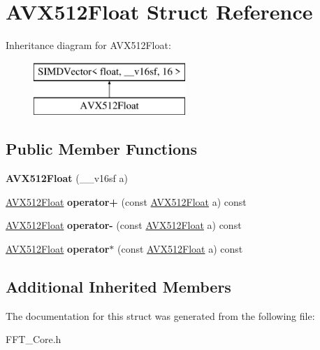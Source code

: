 \hypertarget{struct_a_v_x512_float}{}\section{A\+V\+X512\+Float Struct Reference}
\label{struct_a_v_x512_float}
Inheritance diagram for A\+V\+X512\+Float\+:\begin{figure}[H]
\begin{center}
\leavevmode
\includegraphics[height=2.000000cm]{struct_a_v_x512_float}
\end{center}
\end{figure}
\subsection*{Public Member Functions}
\begin{DoxyCompactItemize}
\item 
\mbox{\label{struct_a_v_x512_float_a0ce2d50f80701d366dfaf02eee399b0b}} 
{\bfseries A\+V\+X512\+Float} (\+\_\+\+\_\+v16sf a)
\item 
\mbox{\label{struct_a_v_x512_float_ad25812839113c94a645a2a60cae62a9b}} 
\hyperlink{struct_a_v_x512_float}{A\+V\+X512\+Float} {\bfseries operator+} (const \hyperlink{struct_a_v_x512_float}{A\+V\+X512\+Float} a) const
\item 
\mbox{\label{struct_a_v_x512_float_a3567e7c1b9cf050882cf7bb7bb103a36}} 
\hyperlink{struct_a_v_x512_float}{A\+V\+X512\+Float} {\bfseries operator-\/} (const \hyperlink{struct_a_v_x512_float}{A\+V\+X512\+Float} a) const
\item 
\mbox{\label{struct_a_v_x512_float_a8fd207ff1b6666fbaa6b3226e265308f}} 
\hyperlink{struct_a_v_x512_float}{A\+V\+X512\+Float} {\bfseries operator$\ast$} (const \hyperlink{struct_a_v_x512_float}{A\+V\+X512\+Float} a) const
\end{DoxyCompactItemize}
\subsection*{Additional Inherited Members}


The documentation for this struct was generated from the following file\+:\begin{DoxyCompactItemize}
\item 
F\+F\+T\+\_\+\+Core.\+h\end{DoxyCompactItemize}
